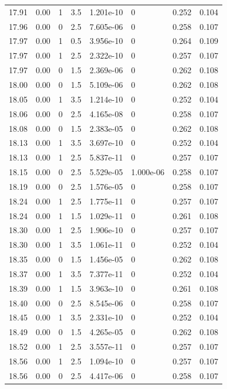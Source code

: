 \documentclass[preview]{standalone}
\begin{document}
{{{{{{{{{{{{{{\begin{tabular}{L{1.2cm}C{1.2cm} C{0.3cm}C{0.5cm} C{1.4cm}C{1.4cm} C{1.4cm}C{1.4cm}}
  17.91  &  0.00  & 1     & 3.5 &  1.201e-10  & 0  & 0.252 &  0.104   \\ 
  17.96  &  0.00  & 0     & 2.5 &  7.605e-06  & 0  & 0.258 &  0.107   \\ 
  17.97  &  0.00  & 1     & 0.5 &  3.956e-10  & 0  & 0.264 &  0.109   \\ 
  17.97  &  0.00  & 1     & 2.5 &  2.322e-10  & 0  & 0.257 &  0.107   \\ 
  17.97  &  0.00  & 0     & 1.5 &  2.369e-06  & 0  & 0.262 &  0.108   \\ 
  18.00  &  0.00  & 0     & 1.5 &  5.109e-06  & 0  & 0.262 &  0.108   \\ 
  18.05  &  0.00  & 1     & 3.5 &  1.214e-10  & 0  & 0.252 &  0.104   \\ 
  18.06  &  0.00  & 0     & 2.5 &  4.165e-08  & 0  & 0.258 &  0.107   \\ 
  18.08  &  0.00  & 0     & 1.5 &  2.383e-05  & 0  & 0.262 &  0.108   \\ 
  18.13  &  0.00  & 1     & 3.5 &  3.697e-10  & 0  & 0.252 &  0.104   \\ 
  18.13  &  0.00  & 1     & 2.5 &  5.837e-11  & 0  & 0.257 &  0.107   \\ 
  18.15  &  0.00  & 0     & 2.5 &  5.529e-05  & 1.000e-06  & 0.258 &  0.107   \\ 
  18.19  &  0.00  & 0     & 2.5 &  1.576e-05  & 0  & 0.258 &  0.107   \\ 
  18.24  &  0.00  & 1     & 2.5 &  1.775e-11  & 0  & 0.257 &  0.107   \\ 
  18.24  &  0.00  & 1     & 1.5 &  1.029e-11  & 0  & 0.261 &  0.108   \\ 
  18.30  &  0.00  & 1     & 2.5 &  1.906e-10  & 0  & 0.257 &  0.107   \\ 
  18.30  &  0.00  & 1     & 3.5 &  1.061e-11  & 0  & 0.252 &  0.104   \\ 
  18.35  &  0.00  & 0     & 1.5 &  1.456e-05  & 0  & 0.262 &  0.108   \\ 
  18.37  &  0.00  & 1     & 3.5 &  7.377e-11  & 0  & 0.252 &  0.104   \\ 
  18.39  &  0.00  & 1     & 1.5 &  3.963e-10  & 0  & 0.261 &  0.108   \\ 
  18.40  &  0.00  & 0     & 2.5 &  8.545e-06  & 0  & 0.258 &  0.107   \\ 
  18.45  &  0.00  & 1     & 3.5 &  2.331e-10  & 0  & 0.252 &  0.104   \\ 
  18.49  &  0.00  & 0     & 1.5 &  4.265e-05  & 0  & 0.262 &  0.108   \\ 
  18.52  &  0.00  & 1     & 2.5 &  3.557e-11  & 0  & 0.257 &  0.107   \\ 
  18.56  &  0.00  & 1     & 2.5 &  1.094e-10  & 0  & 0.257 &  0.107   \\ 
  18.56  &  0.00  & 0     & 2.5 &  4.417e-06  & 0  & 0.258 &  0.107   \\ 
\hline 
\end{tabular} 

}}}}}}}}}}}}}}
\end{document}
